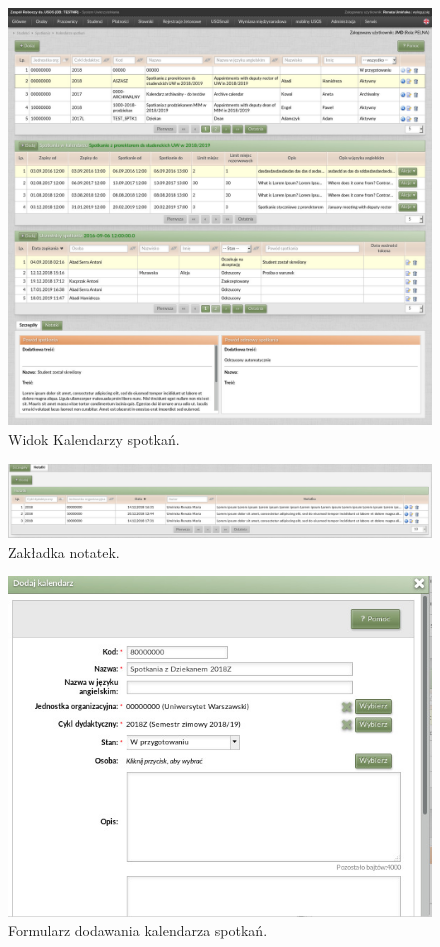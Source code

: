 \documentclass[licencjacka]{pracamgr}
\begin{document}
\begin{figure}[!]
  \includegraphics[width=\linewidth]{widok_kalendarzy.jpg}
  \caption{Widok Kalendarzy spotkań.}
  \label{fig:kalenadm}
\end{figure}

\begin{figure}[!]
  \includegraphics[width=\linewidth]{widok_kalendarzy_tabela_notatek.jpg}
  \caption{Zakładka notatek.}
  \label{fig:kalennotadm}
\end{figure}

\begin{figure}[!]
  \includegraphics[width=\linewidth]{formularz_kalendarzy.jpg}
  \caption{Formularz dodawania kalendarza spotkań.}
  \label{fig:kalenformkalenadm}
\end{figure}
\end{document}
